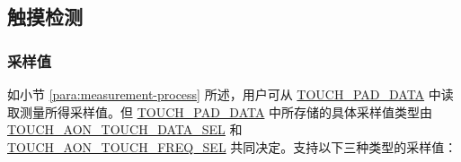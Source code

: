 \documentclass[main\_\_CN.tex]{subfiles}
\begin{document}
\subsection{触摸检测}

\subsubsection{采样值}
\label{para:sampled-value}

如小节 \ref{para:measurement-process} 所述，用户可从
\hyperref[fielddesc:TOUCHPAD0DATA]{TOUCH\_PAD\_DATA} 中读取测量所得采样值。但 \hyperref[fielddesc:TOUCHPAD0DATA]{TOUCH\_PAD\_DATA} 中所存储的具体采样值类型由 \hyperref[fielddesc:TOUCHAONTOUCHDATASEL]{TOUCH\_AON\_TOUCH\_DATA\_SEL} 和 \hyperref[fielddesc:TOUCHAONTOUCHFREQSEL]{TOUCH\_AON\_TOUCH\_FREQ\_SEL} 共同决定。支持以下三种类型的采样值： 
\end{document}
